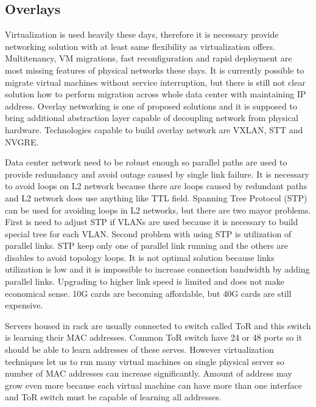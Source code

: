 \subsection{Overlays}
\label{par:overlays}
Virtualization is used heavily these days, therefore it is necessary provide networking solution with at least same flexibility as virtualization offers. Multitenancy, \Ac{VM} migrations, fast reconfiguration and rapid deployment are most missing features of physical networks these days. It is currently possible to migrate virtual machines without service interruption, but there is still not clear solution how to perform migration across whole data center with maintaining \Ac{IP} address. Overlay networking is one of proposed solutions and it is supposed to bring additional abstraction layer capable of decoupling network from physical hardware. 
Technologies capable to build overlay network are \Ac{VXLAN}, \Ac{STT} and \Ac{NVGRE}. 

Data center network need to be robust enough so parallel paths are used to provide redundancy and avoid outage caused by single link failure. It is necessary to avoid loops on L2 network because there are loops caused by redundant paths and L2 network does use anything like \Ac{TTL} field.  Spanning Tree Protocol (\Ac{STP}) can be used for avoiding loops in L2 networks, but there are two mayor problems. First is need to adjust \Ac{STP} if \Ac{VLAN}s are used because it is necessary to build special tree for each \Ac{VLAN}. Second problem with using \Ac{STP} is utilization of parallel links. \Ac{STP} keep only one of parallel link running and the others are disables to avoid topology loops. It is not optimal solution because links utilization is low and it is impossible to increase connection bandwidth by adding parallel links. Upgrading to higher link speed is limited and does not make economical sense. 10G cards are becoming affordable, but 40G cards are still expensive.

Servers housed in rack are usually connected to switch called \Ac{ToR} and this switch is learning their \Ac{MAC} addresses. Common \Ac{ToR} switch have 24 or 48 ports so it should be able to learn addresses of these serves. However virtualization techniques let us to run many virtual machines on single physical server so number of \Ac{MAC} addresses can increase significantly. Amount of address may grow even more because each virtual machine can have more than one interface and \Ac{ToR} switch must be capable of learning all addresses.


